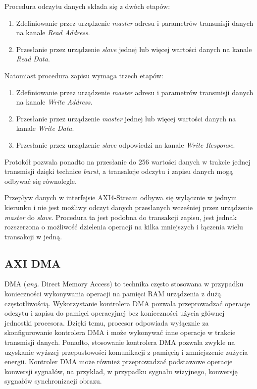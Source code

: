 Procedura odczytu danych składa się z dwóch etapów:
\begin{enumerate}
	\item Zdefiniowanie  przez urządzenie \emph{master} adresu i parametrów transmisji danych na kanale \emph{Read Address}.
	\item Przesłanie przez urządzenie \emph{slave} jednej lub więcej wartości danych na kanale \emph{Read Data}.
\end{enumerate}

Natomiast procedura zapisu wymaga trzech etapów:
\begin{enumerate}
	\item Zdefiniowanie  przez urządzenie \emph{master} adresu i parametrów transmisji danych na kanale \emph{Write Address}.
	\item Przesłanie przez urządzenie \emph{master} jednej lub więcej wartości danych na kanale \emph{Write Data}.
	\item Przesłanie przez urządzenie \emph{slave} odpowiedzi na kanale \emph{Write Response}.
\end{enumerate}

Protokół pozwala ponadto na przesłanie do 256 wartości danych w trakcie jednej transmisji dzięki technice \emph{burst}, a transakcje odczytu i zapisu danych mogą odbywać się równolegle.

Przepływ danych w interfejsie AXI4-Stream odbywa się wyłącznie w jednym kierunku i nie jest możliwy odczyt danych przesłanych wcześniej przez urządzenie \emph{master} do \emph{slave}. Procedura ta jest podobna do transakcji zapisu, jest jednak rozszerzona o możliwość dzielenia operacji na kilka mniejszych i łączenia wielu transakcji w jedną.

\subsection{AXI DMA}
DMA (\emph{ang.} Direct Memory Access) to technika często stosowana w przypadku konieczności wykonywania operacji na pamięci RAM urządzenia z dużą częstotliwością. Wykorzystanie kontrolera DMA pozwala przeprowadzać operacje odczytu i zapisu do pamięci operacyjnej bez konieczności użycia głównej jednostki procesora. Dzięki temu, procesor odpowiada wyłącznie za skonfigurowanie kontrolera DMA i może wykonywać inne operacje w trakcie transmisji danych. Ponadto, stosowanie kontrolera DMA pozwala zwykle na uzyskanie wyższej przepustowości komunikacji z pamięcią i zmniejszenie zużycia energii. Kontroler DMA może również przeprowadzać podstawowe operacje konwersji sygnałów, na przykład, w przypadku sygnału wizyjnego, konwersję sygnałów synchronizacji obrazu. 

